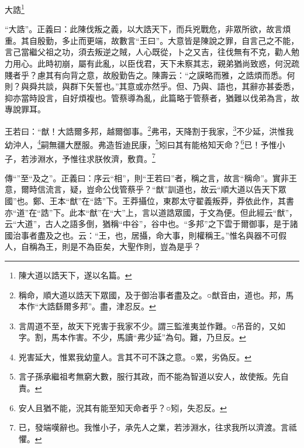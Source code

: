 大誥\footnote{陳大道以誥天下，遂以名篇。}

{\noindent\shu{}\fzkt “大誥”。正義曰：此陳伐叛之義，以大誥天下，而兵兇戰危，非眾所欲，故言煩重。其自殷勤，多止而更端，故數言“王曰”。大意皆是陳說之罪，自言己之不能，言己當繼父祖之功，須去叛逆之賊，人心既從，卜之又吉，往伐無有不克，勸人勉力用心。此時初崩，屬有此亂，以臣伐君，天下未察其志，親弟猶尚致惑，何況疏賤者乎？慮其有向背之意，故殷勤告之。陳壽云：“之謨略而雅，之誥煩而悉。何則？與舜共談，與群下矢誓也。”其意或亦然乎。但、乃與、語也，其辭亦甚委悉，抑亦當時設言，自好煩複也。管蔡導為亂，此篇略于管蔡者，猶難以伐弟為言，故專說罪耳。 \par}

王若曰：“猷！大誥爾多邦，越爾御事。\footnote{稱命，順大道以誥天下眾國，及于御治事者盡及之。○猷音由，道也。邦，馬本作“大誥繇爾多邦”。盡，津忍反。}弗弔，天降割于我家，\footnote{言周道不至，故天下兇害于我家不少。謂三監淮夷並作難。○吊音的，又如字。割，馬本作害。不少，馬讀“弗少延”為句。難，乃旦反。}不少延，洪惟我幼沖人，\footnote{兇害延大，惟累我幼童人。言其不可不誅之意。○累，劣偽反。}嗣無疆大歷服。弗造哲迪民康，\footnote{言子孫承繼祖考無窮大數，服行其政，而不能為智道以安人，故使叛。先自責。}矧曰其有能格知天命？\footnote{安人且猶不能，況其有能至知天命者乎？○矧，失忍反。}已！予惟小子，若涉淵水，予惟往求朕攸濟，敷賁。\footnote{已，發端嘆辭也。我惟小子，承先人之業，若涉淵水，往求我所以濟渡。言祗懼。}


{\noindent\zhuan{}\fzbyks 傳“”至“及之”。正義曰：序云“相”，則“王若曰”者，稱之言，故言“稱命”。實非王意，爾時信流言，疑，豈命公伐管蔡乎？“猷”訓道也，故云“順大道以告天下眾國”也。鄭、王本“猷”在“誥”下。王莽攝位，東郡太守翟義叛莽，莽依此作，其書亦“道”在“誥”下。此本“猷”在“大”上，言以道誥眾國，于文為便。但此經云“猷”，云“大道”，古人之語多倒，猶稱“中谷”，谷中也。“多邦”之下雲于爾御事，是于諸國治事者盡及之也。云：“王，也，居攝，命大事，則權稱王。”惟名與器不可假人，自稱為王，則是不為臣矣，大聖作則，豈為是乎？ \par}

